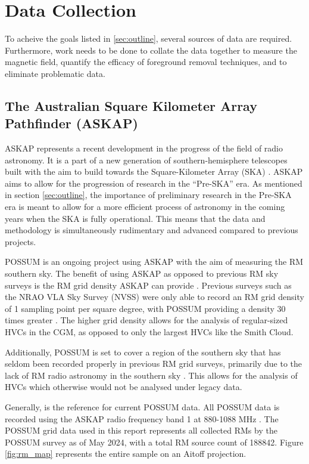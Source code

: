 \chapter{Data Collection}
\label{cha:data}

To acheive the goals listed in \ref{sec:outline}, several sources of data are required. Furthermore, work needs to be done to collate the data together to measure the magnetic field, quantify the efficacy of foreground removal techniques, and to eliminate problematic data.

\section{The Australian Square Kilometer Array Pathfinder (ASKAP)}
\label{sec:ASKAP}

ASKAP represents a recent development in the progress of the field of radio astronomy. It is a part of a new generation of southern-hemisphere telescopes built with the aim to build towards the Square-Kilometer Array (SKA) \citep{ID61, ID52}. ASKAP aims to allow for the progression of research in the “Pre-SKA” era. As mentioned in section \ref{sec:outline}, the importance of preliminary research in the Pre-SKA era is meant to allow for a more efficient process of astronomy in the coming years when the SKA is fully operational. This means that the data and methodology is simultaneously rudimentary and advanced compared to previous projects.


POSSUM is an ongoing project using ASKAP with the aim of measuring the RM southern sky. The benefit of using ASKAP as opposed to previous RM sky surveys is the RM grid density ASKAP can provide \citep{ID52, ID61}. Previous surveys such as the NRAO VLA Sky Survey (NVSS) were only able to record an RM grid density of 1 sampling point per square degree, with POSSUM providing a density 30 times greater \citep{ID1, ID52, ID61, ID18}. The higher grid density allows for the analysis of regular-sized HVCs in the CGM, as opposed to only the largest HVCs like the Smith Cloud.


Additionally, POSSUM is set to cover a region of the southern sky that has seldom been recorded properly in previous RM grid surveys, primarily due to the lack of RM radio astronomy in the southern sky \citep{ID44, ID45, ID52}. This allows for the analysis of HVCs which otherwise would not be analysed under legacy data.


Generally, \cite{ID52} is the reference for current POSSUM data. All POSSUM data is recorded using the ASKAP radio frequency band 1 at 880-1088 MHz \citep{ID1, ID52}. The POSSUM grid data used in this report represents all collected RMs by the POSSUM survey as of May 2024, with a total RM source count of 188842. Figure \ref{fig:rm_map} represents the entire sample on an Aitoff projection.

